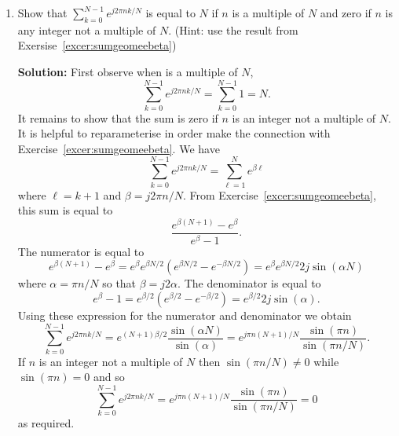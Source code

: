 \documentclass[11pt,a4paper]{book}
\theoremstyle{plain}
\numberwithin{equation}{section}
\newcommand{\vtick}[1]{\draw (#1,-0.075) -- (#1,0.075) }
\newcommand{\htick}[1]{\draw (-0.075,#1) -- (0.075,#1)}
\newenvironment{solution}{\begin{footnotesize}\textbf{Solution:}}{\end{footnotesize}}
\newenvironment{excersizelist}{%
  \renewcommand*{\theenumi}{\thechapter.\arabic{enumi}}%
  \newcommand\itemadvanced{\stepcounter{enumi}\item[$\ast$\, \theenumi.]}
  \begin{enumerate}
}{%
  \end{enumerate}
}
\begin{document}
\begin{excersizelist}
\item \label{exer:sumcomplexdelta} Show that $\sum_{k = 0}^{N-1} e^{j 2\pi n k / N}$ is equal to $N$ if $n$ is a multiple of $N$ and zero if $n$ is any integer not a multiple of $N$. (Hint: use the result from Exersise~\ref{excer:sumgeomeebeta})
\begin{solution}
First observe when is a multiple of $N$,
\[
\sum_{k = 0}^{N-1} e^{j 2\pi n k / N} = \sum_{k = 0}^{N-1} 1 = N.
\]
It remains to show that the sum is zero if $n$ is an integer not a multiple of $N$.
It is helpful to reparameterise in order make the connection with Exercise~\ref{excer:sumgeomeebeta}.  We have
\[
\sum_{k = 0}^{N-1} e^{j 2\pi n k / N} = \sum_{\ell = 1}^N e^{\beta \ell} 
\]
where $\ell = k + 1$ and $\beta = j 2\pi n / N$.  From Exercise~\ref{excer:sumgeomeebeta}, this sum is equal to
\[
 \frac{e^{\beta (N+1)} - e^\beta}{e^\beta - 1}.
\]
The numerator is equal to
 \[
 e^{\beta (N+1)} - e^\beta = e^{\beta}e^{\beta N/2}(e^{\beta N/2} - e^{-\beta N/2}) = e^{\beta}e^{\beta N/2} 2 j \sin(\alpha N)
 \]
where $\alpha = \pi n/N$ so that $\beta = j 2 \alpha$.  The denominator is equal to
\[
e^\beta - 1 = e^{\beta/2}(e^{\beta/2} - e^{-\beta/2}) = e^{\beta/2} 2 j \sin(\alpha) .
\]
Using these expression for the numerator and denominator we obtain
\[
\sum_{k = 0}^{N-1} e^{j 2\pi n k / N} = e^{(N+1) \beta /2} \frac{\sin(\alpha N)}{ \sin(\alpha) } = e^{j \pi n (N+1)/N} \frac{\sin(\pi n)}{ \sin(\pi n / N) }.
\]
If $n$ is an integer not a multiple of $N$ then $\sin( \pi n / N) \neq 0$ while $\sin(\pi n) = 0$ and so
\[
\sum_{k = 0}^{N-1} e^{j 2\pi n k / N} = e^{j \pi n (N+1)/N} \frac{\sin(\pi n)}{ \sin(\pi n / N) } = 0
\]
as required.
\end{solution}




\end{excersizelist}
\end{document}
